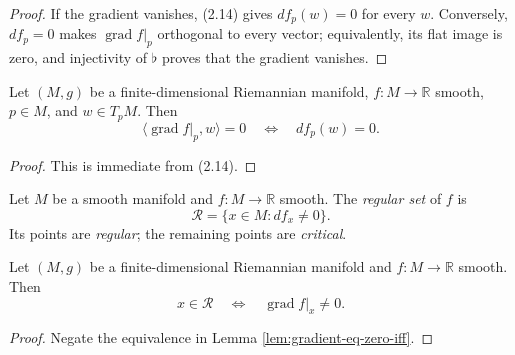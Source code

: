 \begin{proof}

\sketch If the gradient vanishes, (2.14) gives $df_p(w)=0$ for every $w$. Conversely,
$df_p=0$ makes $\operatorname{grad}f|_p$ orthogonal to every vector; equivalently,
its flat image is zero, and injectivity of $\flat$ proves that the gradient vanishes.
\end{proof}

\begin{lemma}
\label{lem:gradient-orthogonal-iff}





Let $(M,g)$ be a finite-dimensional Riemannian manifold, $f\colon M\to\mathbb R$
smooth, $p\in M$, and $w\in T_pM$. Then
\[
\langle\operatorname{grad}f|_p,w\rangle=0
\quad\Longleftrightarrow\quad df_p(w)=0.
\]
\end{lemma}

\begin{proof}

\sketch This is immediate from (2.14).
\end{proof}

\begin{definition}
\label{def:regular-set}




Let $M$ be a smooth manifold and $f\colon M\to\mathbb R$ smooth. The
\emph{regular set} of $f$ is
\[
\mathcal R=\{x\in M:df_x\ne0\}.
\]
Its points are \emph{regular}; the remaining points are \emph{critical}.
\end{definition}

\begin{lemma}
\label{lem:regular-set-eq-gradient-nonvanishing}





Let $(M,g)$ be a finite-dimensional Riemannian manifold and $f\colon M\to\mathbb R$
smooth. Then
\[
x\in\mathcal R\quad\Longleftrightarrow\quad\operatorname{grad}f|_x\ne0.
\]
\end{lemma}

\begin{proof}

\sketch Negate the equivalence in Lemma \ref{lem:gradient-eq-zero-iff}.
\end{proof}


